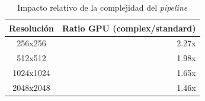 \begin{table}[htbp]
\centering
\renewcommand{\arraystretch}{1.2}
\setlength{\tabcolsep}{8pt}
\begin{tabular}{|c|r|}
\hline
\rowcolor[gray]{0.90}
\textbf{Resolución} & \textbf{Ratio GPU (complex/standard)} \\
\hline
256x256 & 2.27x \\
\hline
512x512 & 1.98x \\
\hline
1024x1024 & 1.65x \\
\hline
2048x2048 & 1.46x \\
\hline
\end{tabular}
\caption{Impacto relativo de la complejidad del \textit{pipeline}}
\label{tab:complexity_ratio_equipo1_float32}
\end{table}
